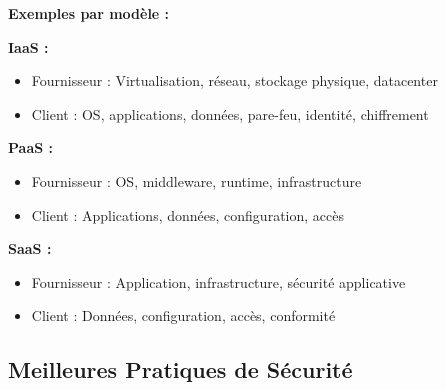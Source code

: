 \documentclass[11pt,a4paper]{article}
\begin{document}
\textbf{Exemples par modèle :}

\textbf{IaaS :}
\begin{itemize}
    \item Fournisseur : Virtualisation, réseau, stockage physique, datacenter
    \item Client : OS, applications, données, pare-feu, identité, chiffrement
\end{itemize}

\textbf{PaaS :}
\begin{itemize}
    \item Fournisseur : OS, middleware, runtime, infrastructure
    \item Client : Applications, données, configuration, accès
\end{itemize}

\textbf{SaaS :}
\begin{itemize}
    \item Fournisseur : Application, infrastructure, sécurité applicative
    \item Client : Données, configuration, accès, conformité
\end{itemize}

\subsection{Meilleures Pratiques de Sécurité}
\end{document}
